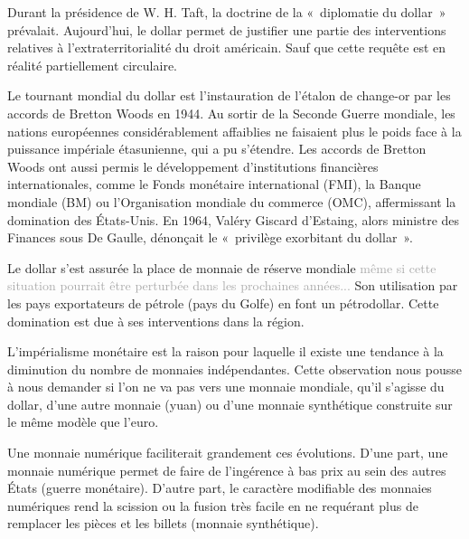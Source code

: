 Durant la présidence de W. H. Taft, la doctrine de la «~diplomatie du dollar~» prévalait. Aujourd'hui, le dollar permet de justifier une partie des interventions relatives à l'extraterritorialité du droit américain. Sauf que cette requête est en réalité partiellement circulaire.

Le tournant mondial du dollar est l'instauration de l'étalon de change-or par les accords de Bretton Woods en 1944. Au sortir de la Seconde Guerre mondiale, les nations européennes considérablement affaiblies ne faisaient plus le poids face à la puissance impériale étasunienne, qui a pu s'étendre. Les accords de Bretton Woods ont aussi permis le développement d'institutions financières internationales, comme le Fonds monétaire international (FMI), la Banque mondiale (BM) ou l'Organisation mondiale du commerce (OMC), affermissant la domination des États-Unis. En 1964, Valéry Giscard d'Estaing, alors ministre des Finances sous De Gaulle, dénonçait le «~privilège exorbitant du dollar~».

Le dollar s'est assurée la place de monnaie de réserve mondiale \textcolor{darkgray}{même si cette situation pourrait être perturbée dans les prochaines années...} Son utilisation par les pays exportateurs de pétrole (pays du Golfe) en font un pétrodollar. Cette domination est due à ses interventions dans la région.


L'impérialisme monétaire est la raison pour laquelle il existe une tendance à la diminution du nombre de monnaies indépendantes. Cette observation nous pousse à nous demander si l'on ne va pas vers une monnaie mondiale, qu'il s'agisse du dollar, d'une autre monnaie (yuan) ou d'une monnaie synthétique construite sur le même modèle que l'euro. %

Une monnaie numérique faciliterait grandement ces évolutions. D'une part, une monnaie numérique permet de faire de l'ingérence à bas prix au sein des autres États (guerre monétaire). D'autre part, le caractère modifiable des monnaies numériques rend la scission ou la fusion très facile en ne requérant plus de remplacer les pièces et les billets (monnaie synthétique).

